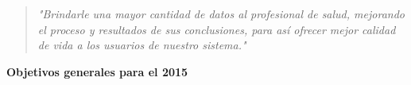 \begin{quote}
\small \textit{ "Brindarle una mayor cantidad de datos al profesional de salud, mejorando el proceso y resultados de sus conclusiones, para así ofrecer mejor calidad de vida a los usuarios de nuestro sistema."}
 \end{quote}

\textbf{Objetivos generales para el 2015} 
 
